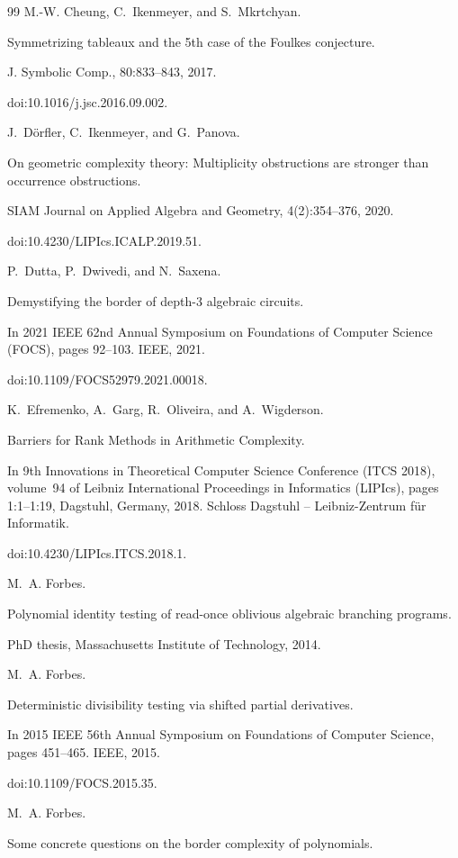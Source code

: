\documentclass[10pt,a4paper]{article}
\begin{document}
\begin{thebibliography}{99}
M.-W. Cheung, C. Ikenmeyer, and S. Mkrtchyan.


Symmetrizing tableaux and the 5th case of the Foulkes conjecture.


J. Symbolic Comp., 80:833–843, 2017.


doi:10.1016/j.jsc.2016.09.002.

J. Dörfler, C. Ikenmeyer, and G. Panova.


On geometric complexity theory: Multiplicity obstructions are
stronger than occurrence obstructions.


SIAM Journal on Applied Algebra and Geometry, 4(2):354–376,
2020.


doi:10.4230/LIPIcs.ICALP.2019.51.

P. Dutta, P. Dwivedi, and N. Saxena.


Demystifying the border of depth-3 algebraic circuits.


In 2021 IEEE 62nd Annual Symposium on Foundations of Computer
Science (FOCS), pages 92–103. IEEE, 2021.


doi:10.1109/FOCS52979.2021.00018.

K. Efremenko, A. Garg, R. Oliveira, and A. Wigderson.


Barriers for Rank Methods in Arithmetic Complexity.


In 9th Innovations in Theoretical Computer Science Conference
(ITCS 2018), volume 94 of Leibniz International Proceedings in
Informatics (LIPIcs), pages 1:1–1:19, Dagstuhl, Germany, 2018. Schloss
Dagstuhl – Leibniz-Zentrum für Informatik.


doi:10.4230/LIPIcs.ITCS.2018.1.

M. A. Forbes.


Polynomial identity testing of read-once oblivious algebraic
branching programs.


PhD thesis, Massachusetts Institute of Technology, 2014.

M. A. Forbes.


Deterministic divisibility testing via shifted partial derivatives.


In 2015 IEEE 56th Annual Symposium on Foundations of Computer
Science, pages 451–465. IEEE, 2015.


doi:10.1109/FOCS.2015.35.

M. A. Forbes.


Some concrete questions on the border complexity of polynomials.



\end{thebibliography}
\end{document}
